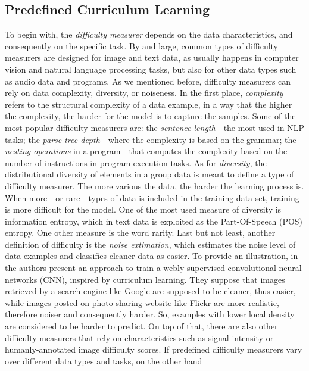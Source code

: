 \subsection{Predefined Curriculum Learning}
\label{subsection:predCL}
To begin with, the \textit{difficulty measurer} depends on the data characteristics, and consequently
on the specific task. 
By and large, common types of difficulty measurers are designed for image and text data, as usually happens in computer vision and natural language processing tasks, 
but also for other data types such as audio data and programs. 
As we mentioned before, difficulty measurers can rely on data complexity, diversity, or noiseness.
In the first place, \textit{complexity} refers to the structural complexity of a data example, in a way that the higher the complexity, 
the harder for the model is to capture the samples. 
Some of the most popular difficulty measurers are: the \textit{sentence length} - the most used in NLP tasks;
the \textit{parse tree depth} - where the complexity is based on the grammar; the \textit{nesting operations} in a program - that computes the complexity based on the number of instructions in
program execution tasks. 
As for \textit{diversity}, the distributional diversity of elements in a group data is meant to define a type of difficulty measurer.
The more various the data, the harder the learning process is.
When more - or rare - types of data is included in the training data set, training is more difficult for the model. 
One of the most used measure of diversity is information entropy, which in text data is exploited as the Part-Of-Speech (POS) entropy. One other measure is the word rarity.
Last but not least, another definition of difficulty is the \textit{noise extimation}, which estimates
the noise level of data examples and classifies cleaner data as easier. To provide an illustration, in \cite{chen2015webly}
the authors present an approach to train a webly supervised convolutional neural networks (CNN), inspired by curriculum learning.
They suppose that images retrieved by a search engine like Google are supposed to be cleaner, thus easier, while images
posted on photo-sharing website like Flickr are more realistic, therefore noiser and consequently harder. 
So, examples with lower local density are considered to be harder to predict. 
On top of that, there are also other difficulty measurers that rely on 
characteristics such as signal intensity or humanly-annotated image difficulty scores.
\newline
If predefined difficulty measurers vary over different data types and tasks, on the other hand
